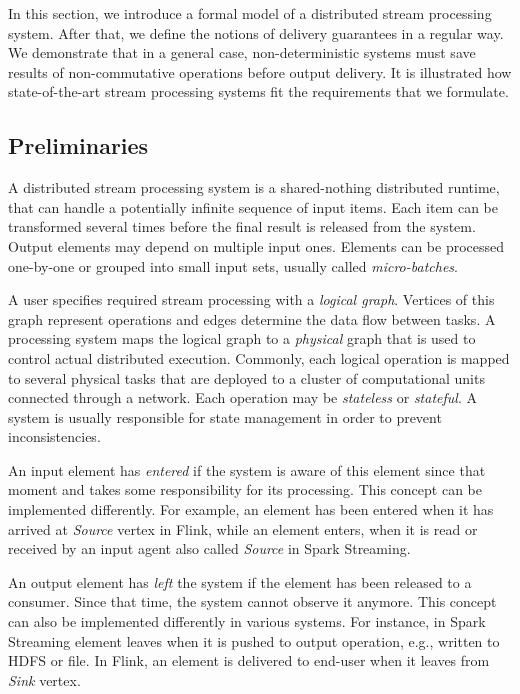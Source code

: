 \label{fs-formalism}

In this section, we introduce a formal model of a distributed stream processing system. After that, we define the notions of delivery guarantees in a regular way. We demonstrate that in a general case, non-deterministic systems must save results of non-commutative operations before output delivery. It is illustrated how state-of-the-art stream processing systems fit the requirements that we formulate.

\subsection{Preliminaries}

A distributed stream processing system is a shared-nothing distributed runtime, that can handle a potentially infinite sequence of input items. Each item can be transformed several times before the final result is released from the system. Output elements may depend on multiple input ones. Elements can be processed one-by-one or grouped into small input sets, usually called {\em micro-batches}. 

A user specifies required stream processing with a {\em logical graph}. Vertices of this graph represent operations and edges determine the data flow between tasks. A processing system maps the logical graph to a {\em physical} graph that is used to control actual distributed execution. Commonly, each logical operation is mapped to several physical tasks that are deployed to a cluster of computational units connected through a network. Each operation may be {\em stateless} or {\em stateful}. A system is usually responsible for state management in order to prevent inconsistencies.

An input element has {\em entered} if the system is aware of this element since that moment and takes some responsibility for its processing. 
This concept can be implemented differently. 
For example,
 an  element has been entered when  it  has arrived at {\em Source} vertex in Flink, while   
an element enters, when it is read or received by an input agent also called  {\em Source}   in Spark Streaming.

An output element has {\em left} the system if the element has been released to a consumer. 
Since that time, the system cannot observe it anymore. This concept can also be implemented differently in various systems. For instance, in Spark Streaming element leaves when it is pushed to output operation, e.g., written to HDFS or file. In Flink, an element is delivered to end-user when it leaves from {\em Sink} vertex.   

